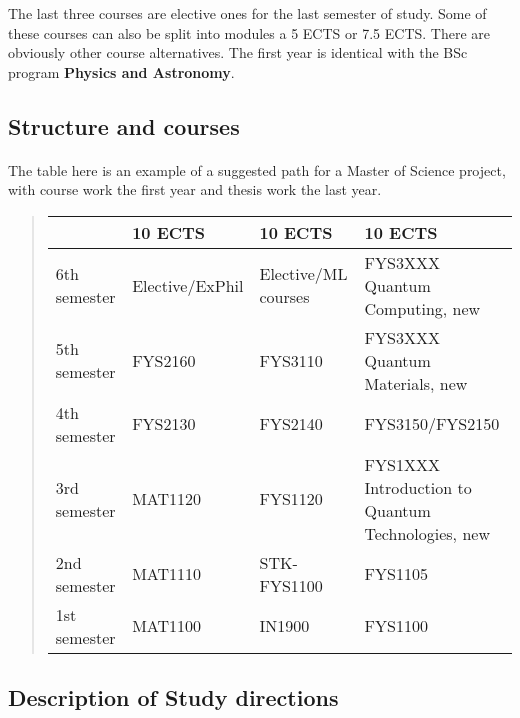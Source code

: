 \documentclass[%
oneside,                 %
final,                   %
10pt]{article}
\begin{document}
\noindent
The last three courses are elective ones for the last semester of study. Some of these courses can also be split into modules a 5 ECTS or 7.5 ECTS.
There are obviously other course alternatives. 
The first year is identical with the BSc program \textbf{Physics and Astronomy}.



\subsection{Structure and courses}

\paragraph{}
The table here is an example of a suggested path for a Master of Science project,
with course work the first year and thesis work the last year.


\begin{quote}
\begin{tabular}{llll}
\hline
\multicolumn{1}{l}{  } & \multicolumn{1}{l}{ 10 ECTS } & \multicolumn{1}{l}{ 10 ECTS } & \multicolumn{1}{l}{ 10 ECTS } \\
\hline
6th semester & Elective/ExPhil & Elective/ML courses & FYS3XXX Quantum Computing, new                    \\
\hline
5th semester & FYS2160         & FYS3110             & FYS3XXX Quantum Materials, new                    \\
\hline
4th semester & FYS2130         & FYS2140             & FYS3150/FYS2150                                   \\
\hline
3rd semester & MAT1120         & FYS1120             & FYS1XXX Introduction to Quantum Technologies, new \\
\hline
2nd semester & MAT1110         & STK-FYS1100         & FYS1105                                           \\
\hline
1st semester & MAT1100         & IN1900              & FYS1100                                           \\
\hline
\end{tabular}
\end{quote}

\noindent



\subsection{Description of Study directions}
\end{document}
